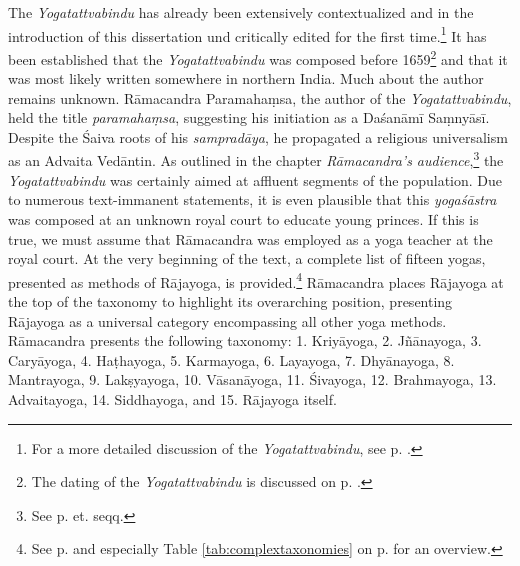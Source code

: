 The \emph{Yogatattvabindu} has already been extensively contextualized and in the introduction of this dissertation und critically edited for the first time.\footnote{For a more detailed discussion of the \emph{Yogatattvabindu}, see p. \pageref{generalremarks}.} It has been established that the \emph{Yogatattvabindu} was composed before 1659\footnote{The dating of the \emph{Yogatattvabindu} is discussed on p. \pageref{dating}.} and that it was most likely written somewhere in northern India. Much about the author remains unknown. Rāmacandra Paramahaṃsa, the author of the \emph{Yogatattvabindu}, held the title \textit{paramahaṃsa}, suggesting his initiation as a Daśanāmī Saṃnyāsī. Despite the Śaiva roots of his \textit{sampradāya}, he propagated a religious universalism as an Advaita Vedāntin. As outlined in the chapter \textit{Rāmacandra's audience},\footnote{See p. \pageref{ytb-audience} et. seqq.} the \emph{Yogatattvabindu} was certainly aimed at affluent segments of the population. Due to numerous text-immanent statements, it is even plausible that this \textit{yogaśāstra} was composed at an unknown royal court to educate young princes. If this is true, we must assume that Rāmacandra was employed as a yoga teacher at the royal court. At the very beginning of the text, a complete list of fifteen yogas, presented as methods of Rājayoga, is provided.\footnote{See p. \pageref{intro} and especially Table \ref{tab:complextaxonomies} on p. \pageref{tab:complextaxonomies} for an overview.} Rāmacandra places Rājayoga at the top of the taxonomy to highlight its overarching position, presenting Rājayoga as a universal category encompassing all other yoga methods. Rāmacandra presents the following taxonomy: 1. Kriyāyoga, 2. Jñānayoga, 3. Caryāyoga, 4. Haṭhayoga, 5. Karmayoga, 6. Layayoga, 7. Dhyānayoga, 8. Mantrayoga, 9. Lakṣyayoga, 10. Vāsanāyoga, 11. Śivayoga, 12. Brahmayoga, 13. Advaitayoga, 14. Siddhayoga, and 15. Rājayoga itself.    

